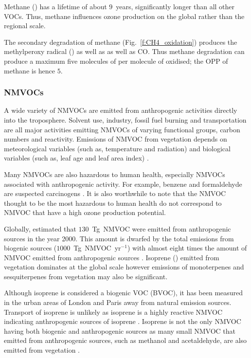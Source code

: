 Methane () has a lifetime of about $9$~years, significantly longer than all other VOCs.
Thus, methane influences ozone production on the global rather than the regional scale.  

The secondary degradation of methane (Fig.~\ref{f:CH4_oxidation}) produces the methylperoxy radical () as well as  as well as CO.
Thus methane degradation can produce a maximum five molecules of  per molecule of  oxidised; the OPP of methane is hence $5$.

\subsubsection{NMVOCs}
A wide variety of NMVOCs are emitted from anthropogenic activities directly into the troposphere.
Solvent use, industry, fossil fuel burning and transportation are all major activities emitting NMVOCs of varying functional groups, carbon numbers and reactivity.
Emissions of NMVOC from vegetation depends on meteorological variables (such as, temperature and radiation) and biological variables (such as, leaf age and leaf area index) \citep{Guenther:2012}.

Many NMVOCs are also hazardous to human health, especially NMVOCs associated with anthropogenic activity.
For example, benzene and formaldehyde are suspected carcinogens \citep{Laurent:2014}.
It is also worthwhile to note that the NMVOC thought to be the most hazardous to human health do not correspond to NMVOC that have a high ozone production potential.

Globally, \citet{Lamarque:2010} estimated that $130$~Tg~NMVOC were emitted from anthropogenic sources in the year 2000.
This amount is dwarfed by the total emissions from biogenic sources ($1000$~Tg~NMVOC~yr$^{-1}$) with almost eight times the amount of NMVOC emitted from anthropogenic sources \citep{Guenther:2012}.
Isoprene () emitted from vegetation dominates at the global scale however emissions of monoterpenes and sesquiterpenes from vegetation may also be significant.

Although isoprene is considered a biogenic VOC (BVOC), it has been measured in the urban areas of London and Paris away from natural emission sources.
Transport of isoprene is unlikely as isoprene is a highly reactive NMVOC indicating anthropogenic sources of isoprene \citep{vonSchneidemesser:2011}.
Isoprene is not the only NMVOC having both biogenic and anthropogenic sources as many small NMVOC that emitted from anthropogenic sources, such as methanol and acetaldehyde, are also emitted from vegetation \citep{Guenther:2012}.

